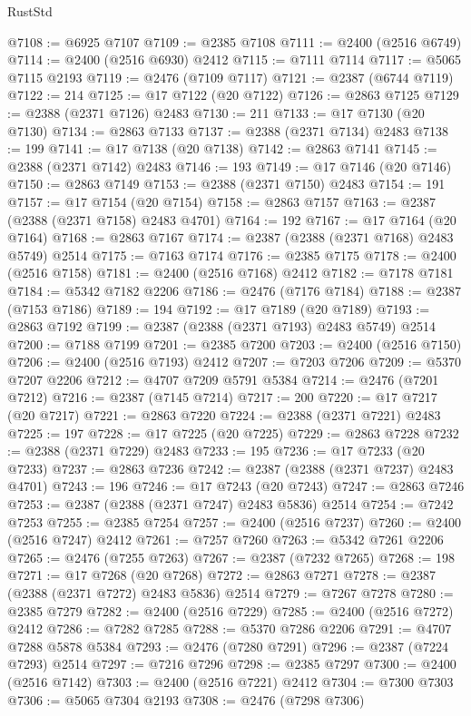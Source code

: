 \begin{lexlean}{RustStd}
\begin{coremodule}
{\begin{coremodule}
{{{{{{{{{{{{{{{{{{{{{{{{{{{{{{{{{{{{{{{{{{{{{{{{{{@7108 := @6925 @7107
@7109 := @2385 @7108
@7111 := @2400 (@2516 @6749)
@7114 := @2400 (@2516 @6930) @2412
@7115 := @7111 @7114
@7117 := @5065 @7115 @2193
@7119 := @2476 (@7109 @7117)
@7121 := @2387 (@6744 @7119)
@7122 := 214
@7125 := @17 @7122 (@20 @7122)
@7126 := @2863 @7125
@7129 := @2388 (@2371 @7126) @2483
@7130 := 211
@7133 := @17 @7130 (@20 @7130)
@7134 := @2863 @7133
@7137 := @2388 (@2371 @7134) @2483
@7138 := 199
@7141 := @17 @7138 (@20 @7138)
@7142 := @2863 @7141
@7145 := @2388 (@2371 @7142) @2483
@7146 := 193
@7149 := @17 @7146 (@20 @7146)
@7150 := @2863 @7149
@7153 := @2388 (@2371 @7150) @2483
@7154 := 191
@7157 := @17 @7154 (@20 @7154)
@7158 := @2863 @7157
@7163 := @2387 (@2388 (@2371 @7158) @2483 @4701)
@7164 := 192
@7167 := @17 @7164 (@20 @7164)
@7168 := @2863 @7167
@7174 := @2387 (@2388 (@2371 @7168) @2483 @5749) @2514
@7175 := @7163 @7174
@7176 := @2385 @7175
@7178 := @2400 (@2516 @7158)
@7181 := @2400 (@2516 @7168) @2412
@7182 := @7178 @7181
@7184 := @5342 @7182 @2206
@7186 := @2476 (@7176 @7184)
@7188 := @2387 (@7153 @7186)
@7189 := 194
@7192 := @17 @7189 (@20 @7189)
@7193 := @2863 @7192
@7199 := @2387 (@2388 (@2371 @7193) @2483 @5749) @2514
@7200 := @7188 @7199
@7201 := @2385 @7200
@7203 := @2400 (@2516 @7150)
@7206 := @2400 (@2516 @7193) @2412
@7207 := @7203 @7206
@7209 := @5370 @7207 @2206
@7212 := @4707 @7209 @5791 @5384
@7214 := @2476 (@7201 @7212)
@7216 := @2387 (@7145 @7214)
@7217 := 200
@7220 := @17 @7217 (@20 @7217)
@7221 := @2863 @7220
@7224 := @2388 (@2371 @7221) @2483
@7225 := 197
@7228 := @17 @7225 (@20 @7225)
@7229 := @2863 @7228
@7232 := @2388 (@2371 @7229) @2483
@7233 := 195
@7236 := @17 @7233 (@20 @7233)
@7237 := @2863 @7236
@7242 := @2387 (@2388 (@2371 @7237) @2483 @4701)
@7243 := 196
@7246 := @17 @7243 (@20 @7243)
@7247 := @2863 @7246
@7253 := @2387 (@2388 (@2371 @7247) @2483 @5836) @2514
@7254 := @7242 @7253
@7255 := @2385 @7254
@7257 := @2400 (@2516 @7237)
@7260 := @2400 (@2516 @7247) @2412
@7261 := @7257 @7260
@7263 := @5342 @7261 @2206
@7265 := @2476 (@7255 @7263)
@7267 := @2387 (@7232 @7265)
@7268 := 198
@7271 := @17 @7268 (@20 @7268)
@7272 := @2863 @7271
@7278 := @2387 (@2388 (@2371 @7272) @2483 @5836) @2514
@7279 := @7267 @7278
@7280 := @2385 @7279
@7282 := @2400 (@2516 @7229)
@7285 := @2400 (@2516 @7272) @2412
@7286 := @7282 @7285
@7288 := @5370 @7286 @2206
@7291 := @4707 @7288 @5878 @5384
@7293 := @2476 (@7280 @7291)
@7296 := @2387 (@7224 @7293) @2514
@7297 := @7216 @7296
@7298 := @2385 @7297
@7300 := @2400 (@2516 @7142)
@7303 := @2400 (@2516 @7221) @2412
@7304 := @7300 @7303
@7306 := @5065 @7304 @2193
@7308 := @2476 (@7298 @7306)
}}}}}}}}}}}}}}}}}}}}}}}}}}}}}}}}}}}}}}}}}}}}}}}}}}
\end{coremodule}}
\end{coremodule}
\end{lexlean}
